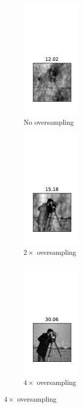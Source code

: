 \begin{figure}
	\begin{subfigure}{.24\textwidth}
		\centering
		\includegraphics[width=3cm, trim= 10 35 10 120]{data/zero-oversampling.pdf}
		\caption{No oversampling}
	\end{subfigure}
	\begin{subfigure}{.24\textwidth}
		\centering
		\includegraphics[width=3cm, trim= 10 35 10 120]{data/two-times-oversampling.pdf}
		\caption{$2\times$ oversampling}
	\end{subfigure}
	\begin{subfigure}{.24\textwidth}
		\centering
		\includegraphics[width=3cm, trim= 10 35 10 120]{data/four-times-oversampling.pdf}
		\caption{$4\times$ oversampling}
	\end{subfigure}

\end{figure}
